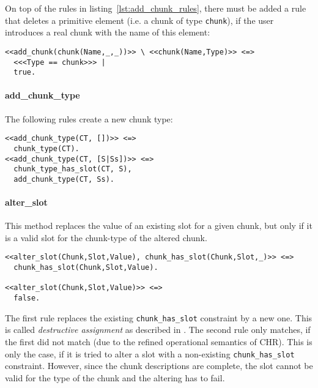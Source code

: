 On top of the rules in listing~\ref{lst:add_chunk_rules}, there must be added a rule that deletes a primitive element (i.e. a chunk of type \lstinline|chunk|), if the user introduces a real chunk with the name of this element:

\begin{lstlisting}[caption={Clean up primitive elements}]  
% delete chunk of Type chunk, if real chunk is added
<<add_chunk(chunk(Name,_,_))>> \ <<chunk(Name,Type)>> <=> 
  <<<Type == chunk>>> |
  true.
\end{lstlisting}


\paragraph{add\_chunk\_type}

The following rules create a new chunk type:

\begin{lstlisting}[caption={rules for \texttt{add\_chunk\_type}}]
<<add_chunk_type(CT, [])>> <=> 
  chunk_type(CT).
<<add_chunk_type(CT, [S|Ss])>> <=> 
  chunk_type_has_slot(CT, S), 
  add_chunk_type(CT, Ss).
\end{lstlisting}

\paragraph{alter\_slot}

This method replaces the value of an existing slot for a given chunk, but only if it is a valid slot for the chunk-type of the altered chunk.

\begin{lstlisting}
<<alter_slot(Chunk,Slot,Value), chunk_has_slot(Chunk,Slot,_)>> <=>
  chunk_has_slot(Chunk,Slot,Value).
  
<<alter_slot(Chunk,Slot,Value)>> <=>
  false.
\end{lstlisting}

The first rule replaces the existing \lstinline|chunk_has_slot| constraint by a new one. This is called \emph{destructive assignment} as described in \cite[32]{fru_chr_book_2009}. The second rule only matches, if the first did not match (due to the refined operational semantics of CHR). This is only the case, if it is tried to alter a slot with a non-existing \lstinline|chunk_has_slot| constraint. However, since the chunk descriptions are complete, the slot cannot be valid for the type of the chunk and the altering has to fail.

